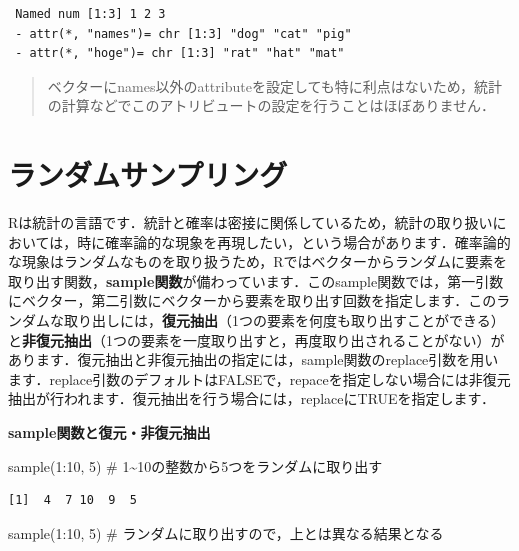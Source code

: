 \documentclass[
  letterpaper,
  DIV=11,
  numbers=noendperiod]{scrreprt}
\newenvironment{Shaded}{\begin{snugshade}}{\end{snugshade}}
\newcommand{\CommentTok}[1]{\textcolor[rgb]{0.37,0.37,0.37}{#1}}
\newcommand{\DecValTok}[1]{\textcolor[rgb]{0.68,0.00,0.00}{#1}}
\newcommand{\FunctionTok}[1]{\textcolor[rgb]{0.28,0.35,0.67}{#1}}
\newcommand{\NormalTok}[1]{\textcolor[rgb]{0.00,0.23,0.31}{#1}}
\newcommand{\SpecialCharTok}[1]{\textcolor[rgb]{0.37,0.37,0.37}{#1}}
\begin{document}
\begin{verbatim}
 Named num [1:3] 1 2 3
 - attr(*, "names")= chr [1:3] "dog" "cat" "pig"
 - attr(*, "hoge")= chr [1:3] "rat" "hat" "mat"
\end{verbatim}

\begin{quote}
ベクターにnames以外のattributeを設定しても特に利点はないため，統計の計算などでこのアトリビュートの設定を行うことはほぼありません．
\end{quote}

\hypertarget{ux30e9ux30f3ux30c0ux30e0ux30b5ux30f3ux30d7ux30eaux30f3ux30b0}{%
\section{ランダムサンプリング}\label{ux30e9ux30f3ux30c0ux30e0ux30b5ux30f3ux30d7ux30eaux30f3ux30b0}}

Rは統計の言語です．統計と確率は密接に関係しているため，統計の取り扱いにおいては，時に確率論的な現象を再現したい，という場合があります．確率論的な現象はランダムなものを取り扱うため，Rではベクターからランダムに要素を取り出す関数，\textbf{sample関数}が備わっています．このsample関数では，第一引数にベクター，第二引数にベクターから要素を取り出す回数を指定します．このランダムな取り出しには，\textbf{復元抽出}（1つの要素を何度も取り出すことができる）と\textbf{非復元抽出}（1つの要素を一度取り出すと，再度取り出されることがない）があります．復元抽出と非復元抽出の指定には，sample関数のreplace引数を用います．replace引数のデフォルトはFALSEで，repaceを指定しない場合には非復元抽出が行われます．復元抽出を行う場合には，replaceにTRUEを指定します．

\textbf{sample関数と復元・非復元抽出}

\begin{Shaded}
\begin{Highlighting}[]
\FunctionTok{sample}\NormalTok{(}\DecValTok{1}\SpecialCharTok{:}\DecValTok{10}\NormalTok{, }\DecValTok{5}\NormalTok{) }\CommentTok{\# 1\textasciitilde{}10の整数から5つをランダムに取り出す}
\end{Highlighting}
\end{Shaded}

\begin{verbatim}
[1]  4  7 10  9  5
\end{verbatim}

\begin{Shaded}
\begin{Highlighting}[]
\FunctionTok{sample}\NormalTok{(}\DecValTok{1}\SpecialCharTok{:}\DecValTok{10}\NormalTok{, }\DecValTok{5}\NormalTok{) }\CommentTok{\# ランダムに取り出すので，上とは異なる結果となる}
\end{Highlighting}
\end{Shaded}
\end{document}
